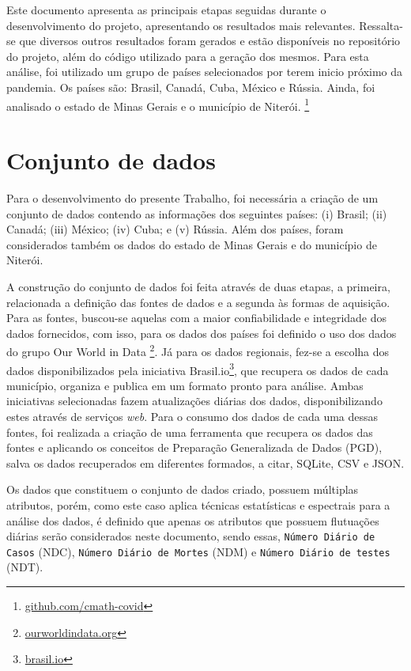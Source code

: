 \documentclass[a4paper,12pt]{article}
\begin{document}
\par Este documento apresenta as principais etapas seguidas durante o desenvolvimento do projeto, apresentando os resultados mais relevantes. Ressalta-se que diversos outros resultados foram gerados e estão disponíveis no repositório do projeto, além do código utilizado para a geração dos mesmos. Para esta análise, foi utilizado um grupo de países selecionados por terem inicio próximo da pandemia. Os países são: Brasil, Canadá, Cuba, México e Rússia. Ainda, foi analisado o estado de Minas Gerais e o município de Niterói.  \footnote{\href{https://github.com/cmath-covid}{github.com/cmath-covid}}

\section{Conjunto de dados}

\par Para o desenvolvimento do presente Trabalho, foi necessária a criação de um conjunto de dados contendo as informações dos seguintes países: (i) Brasil; (ii) Canadá; (iii) México; (iv) Cuba; e (v) Rússia. Além dos países, foram considerados também os dados do estado de Minas Gerais e do município de Niterói.

\par A construção do conjunto de dados foi feita através de duas etapas, a primeira, relacionada a definição das fontes de dados e a segunda às formas de aquisição. Para as fontes, buscou-se aquelas com a maior confiabilidade e integridade dos dados fornecidos, com isso, para os dados dos países foi definido o uso dos dados do grupo Our World in Data \footnote{\href{https://ourworldindata.org}{ourworldindata.org}}. Já para os dados regionais, fez-se a escolha dos dados disponibilizados pela iniciativa Brasil.io\footnote{\href{https://brasil.io}{brasil.io}}, que recupera os dados de cada município, organiza e publica em um formato pronto para análise. Ambas iniciativas selecionadas fazem atualizações diárias dos dados, disponibilizando estes através de serviços \textit{web}. Para o consumo dos dados de cada uma dessas fontes, foi realizada a criação de uma ferramenta que recupera os dados das fontes e aplicando os conceitos de Preparação Generalizada de Dados (PGD), salva os dados recuperados em diferentes formados, a citar, SQLite, CSV e JSON.

\par Os dados que constituem o conjunto de dados criado, possuem múltiplas atributos, porém, como este caso aplica técnicas estatísticas e espectrais para a análise dos dados, é definido que apenas os atributos que possuem flutuações diárias serão considerados neste documento, sendo essas, \texttt{Número Diário de Casos} (NDC), \texttt{Número Diário de Mortes} (NDM) e \texttt{Número Diário de testes} (NDT).
\end{document}

